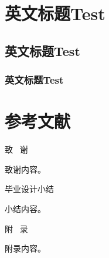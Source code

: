 \documentclass{nwputhesis}
\begin{document}
\section{英文标题Test}
\subsection{英文标题Test}
\subsubsection{英文标题Test}
\makespace
\section*{参考文献}
\begingroup  %
\renewcommand{\section}[2]{}




\makespace %
\section*{致谢}
\begin{center}
    { \blackti \fontsize{16.0600pt}{1.25}致 \, 谢}
\end{center}
致谢内容。

\section*{毕业设计小结}
\makespace
\begin{center}
    { \blackti \fontsize{16.0600pt}{1.25}毕业设计小结}
\end{center}
小结内容。

\makespace
\section*{附录}
\begin{center}
    { \blackti \fontsize{16.0600pt}{1.25}附 \, 录}
\end{center}
附录内容。
\end{document}

